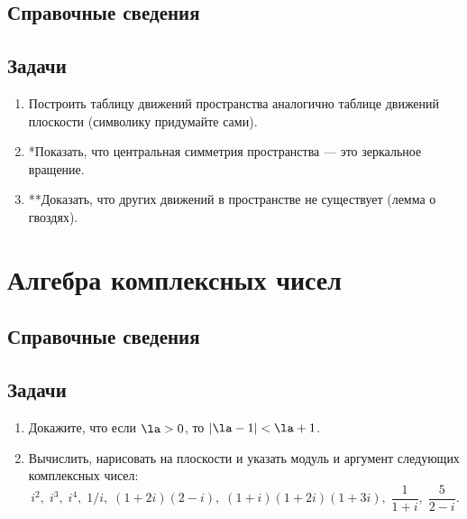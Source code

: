 \subsection*{Справочные сведения}

\subsection*{Задачи}

\begin{enumerate}
\item Построить таблицу движений пространства аналогично таблице движений плоскости (символику придумайте сами).
\item *Показать, что центральная симметрия пространства --- это зеркальное вращение.
\item **Доказать, что других движений в пространстве не существует (лемма о гвоздях).
\end{enumerate}



\begin{comment}
\chapter{12. Комплексная арифметика и алгебра}
\end{comment}


\section{Алгебра комплексных чисел}

\subsection*{Справочные сведения}

\subsection*{Задачи}


\begin{enumerate}
\item Докажите, что если $\la>0$, то $|\la-1|<\la+1$.
\item Вычислить, нарисовать на плоскости и указать модуль и аргумент следующих комплексных чисел:
$$
i^2,\;i^3,\;i^4,\;1/i,\;(1+2i)(2-i),\;(1+i)(1+2i)(1+3i),\;\frac{1}{1+i},\;\frac{5}{2-i}.
$$
\end{enumerate}


